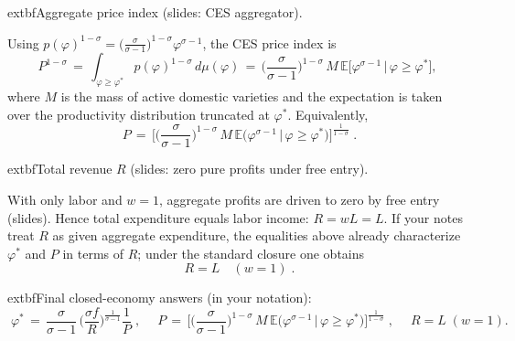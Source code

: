\begin{solution}
    \bigskip
    	extbf{Aggregate price index (slides: CES aggregator).}
    
    Using $p(\varphi)^{1-\sigma}=\big(\tfrac{\sigma}{\sigma-1}\big)^{1-\sigma} \varphi^{\sigma-1}$, the CES price index is
    \[
        P^{1-\sigma} \,=\, \int_{\varphi\ge \varphi^*} p(\varphi)^{1-\sigma}\, d\mu(\varphi)
        \,=\, \Big(\frac{\sigma}{\sigma-1}\Big)^{1-\sigma}\, M\, \mathbb{E}\big[\varphi^{\sigma-1}\,\big|\,\varphi\ge \varphi^*\big],
    \]
    where $M$ is the mass of active domestic varieties and the expectation is taken over the productivity distribution truncated at $\varphi^*$. Equivalently,
    \[
        \boxed{\;\displaystyle P \,=\, \Big[\Big(\frac{\sigma}{\sigma-1}\Big)^{1-\sigma}\, M\, \mathbb{E}\big(\varphi^{\sigma-1}\,\big|\,\varphi\ge \varphi^*\big)\Big]^{\!\tfrac{1}{1-\sigma}}\; }.
    \]
    
    \bigskip
    	extbf{Total revenue $R$ (slides: zero pure profits under free entry).}
    
    With only labor and $w=1$, aggregate profits are driven to zero by free entry (slides). Hence total expenditure equals labor income: $R= wL = L$. If your notes treat $R$ as given aggregate expenditure, the equalities above already characterize $\varphi^*$ and $P$ in terms of $R$; under the standard closure one obtains
    \[
        \boxed{\; R = L \quad (w=1)\; }.
    \]
    
    \bigskip
    	extbf{Final closed-economy answers (in your notation):}
    \[
    \boxed{\;\displaystyle \varphi^* \,=\, \frac{\sigma}{\sigma-1}\,\Big(\frac{\sigma f}{R}\Big)^{\!\frac{1}{\sigma-1}} \frac{1}{P}\; },
    \quad
    \boxed{\;\displaystyle P \,=\, \Big[\Big(\frac{\sigma}{\sigma-1}\Big)^{1-\sigma}\, M\, \mathbb{E}\big(\varphi^{\sigma-1}\,\big|\,\varphi\ge \varphi^*\big)\Big]^{\!\tfrac{1}{1-\sigma}}\; },
    \quad
    \boxed{\; R = L\; (w=1) }.
    \]
\end{solution}